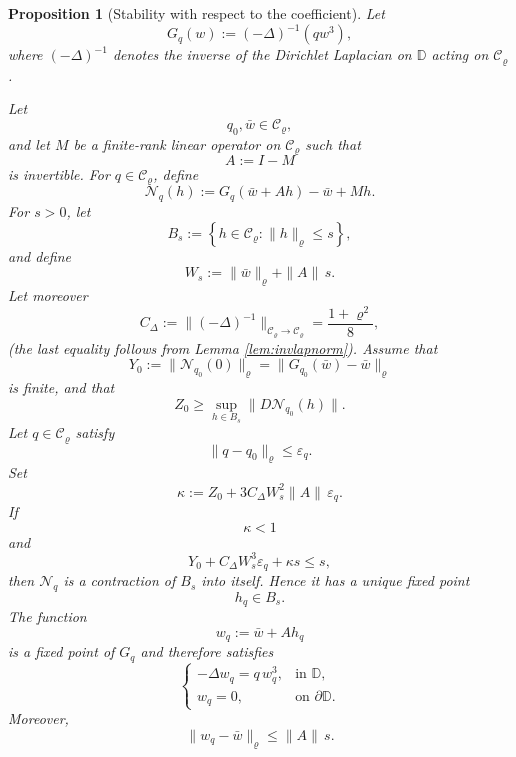 \documentclass[11pt,a4paper]{amsart}
\newtheorem{proposition}[theorem]{Proposition}
\begin{document}
\begin{proposition}[Stability with respect to the coefficient]
	\label{prop:elliptic-q-stability}
	Let
	\[
	G_q(w)
	:=
	(-\Delta)^{-1}(qw^3),
	\]
	where $(-\Delta)^{-1}$ denotes the inverse of the Dirichlet Laplacian
	on $\mathbb D$ acting on $\mathcal{C}_\varrho$.
	
	Let
	\[
	q_0,\bar w\in\mathcal C_\varrho,
	\]
	and let $M$ be a finite-rank linear operator on $\mathcal C_\varrho$ such that
	\[
	A:=I-M
	\]
is invertible. For $q\in\mathcal C_\varrho$, define
	\begin{equation}\label{eq:Nq}
		\mathcal N_q(h)
		:=
		G_q(\bar w+Ah)-\bar w+Mh.
	\end{equation}
	For $s>0$, let
	\[B_s:=\left\{h\in\mathcal C_\varrho:\|h\|_\varrho\le s\right\},
	\]
	and define
	\begin{equation}\label{eq:Us}
		W_s:=\|\bar w\|_\varrho+\|A\|\,s.
	\end{equation}
	Let moreover
	\[
	C_\Delta:=
	\|(-\Delta)^{-1}\|_{\mathcal C_\varrho\to\mathcal C_\varrho}=\frac{1+\varrho^2}{8},
	\]
(the last equality follows from Lemma \ref{lem:invlapnorm}).
	Assume that
	\begin{equation}\label{eq:Y0ell}
		Y_0:=\|\mathcal N_{q_0}(0)\|_\varrho=\|G_{q_0}(\bar w)-\bar w\|_\varrho
	\end{equation}
	is finite, and that
	\begin{equation}\label{eq:Z0ell}
		Z_0\ge\sup_{h\in B_s}\|D\mathcal N_{q_0}(h)\|.
	\end{equation}
	Let $q\in\mathcal C_\varrho$ satisfy
	\[
	\|q-q_0\|_\varrho\le\varepsilon_q.
	\]
	Set
	\begin{equation}\label{eq:kappaell}
		\kappa:=Z_0+3C_\Delta W_s^2\|A\|\,\varepsilon_q.
	\end{equation}
	If
	\begin{equation}\label{eq:ell-contract}
		\kappa<1
	\end{equation}
	and
	\begin{equation}\label{eq:ell-radius}
		Y_0+C_\Delta W_s^3\varepsilon_q+\kappa s\le s,
	\end{equation}
	then $\mathcal N_q$ is a contraction of $B_s$ into itself. Hence it
	has a unique fixed point
	\[
	h_q\in B_s.
	\]
	The function
	\[
	w_q:=\bar w+Ah_q
	\]
	is a fixed point of $G_q$ and therefore satisfies
	\[
	\begin{cases}
		-\Delta w_q=q\,w_q^3,
		&\text{in }\mathbb D,\\
		w_q=0,
		&\text{on }\partial\mathbb D.
	\end{cases}
	\]
	Moreover,
	\begin{equation}\label{eq:u-error}
		\|w_q-\bar w\|_\varrho
		\le
		\|A\|\,s.
	\end{equation}
\end{proposition}
\end{document}
